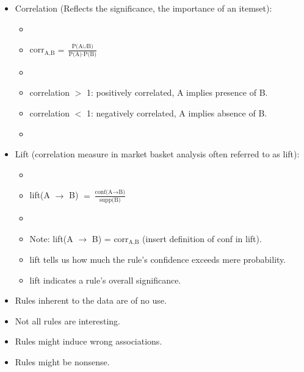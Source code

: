 \begin{breakbox}
\begin{itemize}
	\item Correlation (Reflects the significance, the importance of an itemset):
		\begin{itemize}
			\item[]
			\item[] corr$_\text{A,B} = \frac{\text{P(A} \cup \text{B)}}{\text{P(A)} \cdot \text{P(B)}}$
			\item[]
			\item correlation $>$ 1: positively correlated, A implies presence of B.
			\item correlation $<$ 1: negatively correlated, A implies absence of B.
			\item[]
		\end{itemize}
	\item Lift (correlation measure in market basket analysis often referred to as lift):
		\begin{itemize}
			\item[]
			\item[] lift(A $\rightarrow$ B) $= \frac{\text{conf(A} \rightarrow \text{B)}}{\text{supp(B)}}$
			\item[]
			\item Note: lift(A $\rightarrow$ B) = corr$_\text{A,B}$ (insert definition of conf in lift).
			\item lift tells us how much the rule's confidence exceeds mere probability.
			\item lift indicates a rule's overall significance.
		\end{itemize}
\end{itemize}
\end{breakbox}

\begin{breakbox}
\begin{itemize}
	\item Rules inherent to the data are of no use.
	\item Not all rules are interesting.
	\item Rules might induce wrong associations.
	\item Rules might be nonsense.
\end{itemize}
\end{breakbox}
